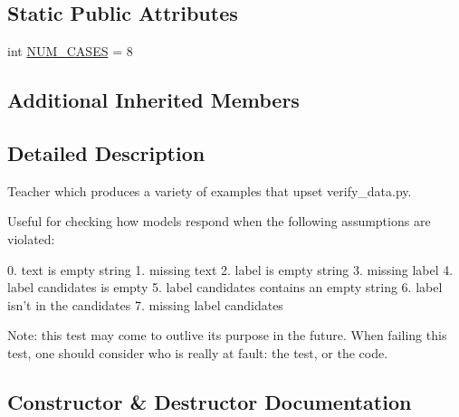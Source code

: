 \subsection*{Static Public Attributes}
\begin{DoxyCompactItemize}
\item 
int \hyperlink{classparlai_1_1tasks_1_1integration__tests_1_1agents_1_1BadExampleTeacher_aa13107dbd3fd1bbff91491e2860ea6dc}{N\+U\+M\+\_\+\+C\+A\+S\+ES} = 8
\end{DoxyCompactItemize}
\subsection*{Additional Inherited Members}


\subsection{Detailed Description}
\begin{DoxyVerb}Teacher which produces a variety of examples that upset verify_data.py.

Useful for checking how models respond when the following assumptions are
violated:

    0. text is empty string
    1. missing text
    2. label is empty string
    3. missing label
    4. label candidates is empty
    5. label candidates contains an empty string
    6. label isn't in the candidates
    7. missing label candidates

Note: this test may come to outlive its purpose in the future. When failing
this test, one should consider who is really at fault: the test, or the code.
\end{DoxyVerb}
 

\subsection{Constructor \& Destructor Documentation}
\mbox{\label{classparlai_1_1tasks_1_1integration__tests_1_1agents_1_1BadExampleTeacher_a977f478a2379e0f40525f3dd5408a87c}} 
